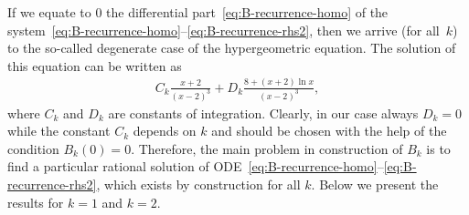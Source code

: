 \documentclass[pdftex]{sigma}
\numberwithin{equation}{section}
\begin{document}
If we equate to $0$ the differential part~\eqref{eq:B-recurrence-homo} of the system~\eqref{eq:B-recurrence-homo}--\eqref{eq:B-recurrence-rhs2}, then we arrive (for all~$k$) to the so-called degenerate
case of the hypergeometric equation. The solution of this equation can be written as
\begin{gather*}
C_k \frac{x+2}{(x-2)^3}+D_k \frac{8+(x+2)\ln x}{(x-2)^3},
\end{gather*}
where $C_k$ and $D_k$ are constants of integration. Clearly, in our case always $D_k=0$ while the constant $C_k$
depends on $k$ and should be chosen with the help of the condition $B_k(0)=0$.
Therefore, the main problem in construction of $B_k$ is to find a particular rational solution of
ODE~\eqref{eq:B-recurrence-homo}--\eqref{eq:B-recurrence-rhs2}, which exists by construction for all $k$.
Below we present the results for $k=1$ and $k=2$.
\end{document}
